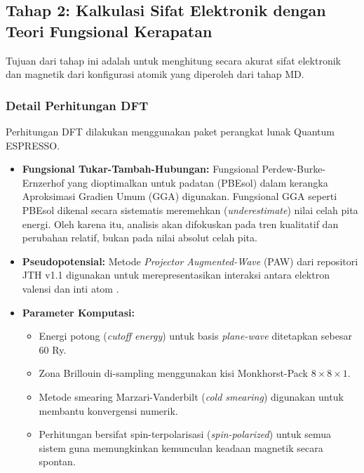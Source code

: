 \subsection{Tahap 2: Kalkulasi Sifat Elektronik dengan Teori Fungsional Kerapatan}
Tujuan dari tahap ini adalah untuk menghitung secara akurat sifat elektronik dan magnetik dari konfigurasi atomik yang diperoleh dari tahap MD.

\subsubsection{Detail Perhitungan DFT}
Perhitungan DFT dilakukan menggunakan paket perangkat lunak Quantum ESPRESSO.
\begin{itemize}
    \item \textbf{Fungsional Tukar-Tambah-Hubungan:} Fungsional Perdew-Burke-Ernzerhof yang dioptimalkan untuk padatan (PBEsol) \citep{Perdew2008} dalam kerangka Aproksimasi Gradien Umum (GGA) digunakan. Fungsional GGA seperti PBEsol dikenal secara sistematis meremehkan (\textit{underestimate}) nilai celah pita energi. Oleh karena itu, analisis akan difokuskan pada tren kualitatif dan perubahan relatif, bukan pada nilai absolut celah pita.
    \item \textbf{Pseudopotensial:} Metode \textit{Projector Augmented-Wave} (PAW) dari repositori JTH v1.1 digunakan untuk merepresentasikan interaksi antara elektron valensi dan inti atom \citep{Blochl1994, Kresse1999}.
    \item \textbf{Parameter Komputasi:}
    \begin{itemize}
        \item Energi potong (\textit{cutoff energy}) untuk basis \textit{plane-wave} ditetapkan sebesar 60 Ry.
        \item Zona Brillouin di-sampling menggunakan kisi Monkhorst-Pack $8 \times 8 \times 1$.
        \item Metode smearing Marzari-Vanderbilt (\textit{cold smearing}) digunakan untuk membantu konvergensi numerik.
        \item Perhitungan bersifat spin-terpolarisasi (\textit{spin-polarized}) untuk semua sistem guna memungkinkan kemunculan keadaan magnetik secara spontan.
    \end{itemize}
\end{itemize}

